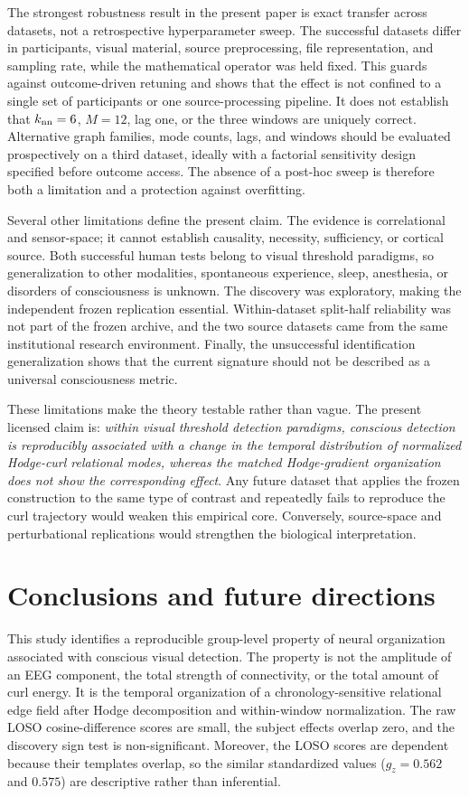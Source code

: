 \documentclass[12pt]{article}
\begin{document}
The strongest robustness result in the present paper is exact transfer across datasets, not a retrospective hyperparameter sweep. The successful datasets differ in participants, visual material, source preprocessing, file representation, and sampling rate, while the mathematical operator was held fixed. This guards against outcome-driven retuning and shows that the effect is not confined to a single set of participants or one source-processing pipeline. It does not establish that $k_{\rm nn}=6$, $M=12$, lag one, or the three windows are uniquely correct. Alternative graph families, mode counts, lags, and windows should be evaluated prospectively on a third dataset, ideally with a factorial sensitivity design specified before outcome access. The absence of a post-hoc sweep is therefore both a limitation and a protection against overfitting.

Several other limitations define the present claim. The evidence is correlational and sensor-space; it cannot establish causality, necessity, sufficiency, or cortical source. Both successful human tests belong to visual threshold paradigms, so generalization to other modalities, spontaneous experience, sleep, anesthesia, or disorders of consciousness is unknown. The discovery was exploratory, making the independent frozen replication essential. Within-dataset split-half reliability was not part of the frozen archive, and the two source datasets came from the same institutional research environment. Finally, the unsuccessful identification generalization shows that the current signature should not be described as a universal consciousness metric.

These limitations make the theory testable rather than vague. The present licensed claim is: \emph{within visual threshold detection paradigms, conscious detection is reproducibly associated with a change in the temporal distribution of normalized Hodge-curl relational modes, whereas the matched Hodge-gradient organization does not show the corresponding effect}. Any future dataset that applies the frozen construction to the same type of contrast and repeatedly fails to reproduce the curl trajectory would weaken this empirical core. Conversely, source-space and perturbational replications would strengthen the biological interpretation.

\section{Conclusions and future directions}
This study identifies a reproducible group-level property of neural organization associated with conscious visual detection. The property is not the amplitude of an EEG component, the total strength of connectivity, or the total amount of curl energy. It is the temporal organization of a chronology-sensitive relational edge field after Hodge decomposition and within-window normalization. The raw LOSO cosine-difference scores are small, the subject effects overlap zero, and the discovery sign test is non-significant. Moreover, the LOSO scores are dependent because their templates overlap, so the similar standardized values ($g_z=0.562$ and $0.575$) are descriptive rather than inferential.
\end{document}
